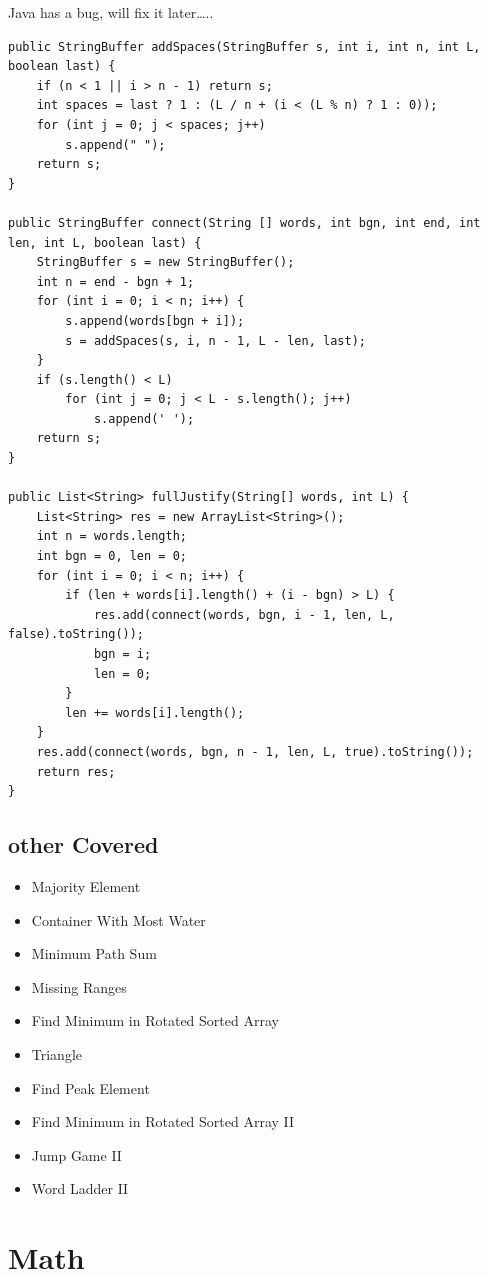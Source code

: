 \documentclass[12pt]{book}
\begin{document}
Java has a bug, will fix it later\ldots{}..

\lstset{language=java,label= ,caption= ,numbers=none}
\begin{lstlisting}
public StringBuffer addSpaces(StringBuffer s, int i, int n, int L, boolean last) {
    if (n < 1 || i > n - 1) return s;
    int spaces = last ? 1 : (L / n + (i < (L % n) ? 1 : 0));
    for (int j = 0; j < spaces; j++)
        s.append(" ");
    return s;
}

public StringBuffer connect(String [] words, int bgn, int end, int len, int L, boolean last) {
    StringBuffer s = new StringBuffer();
    int n = end - bgn + 1;
    for (int i = 0; i < n; i++) {
        s.append(words[bgn + i]);
        s = addSpaces(s, i, n - 1, L - len, last);
    }
    if (s.length() < L)
        for (int j = 0; j < L - s.length(); j++) 
            s.append(' ');
    return s;
}

public List<String> fullJustify(String[] words, int L) {
    List<String> res = new ArrayList<String>();
    int n = words.length;
    int bgn = 0, len = 0;
    for (int i = 0; i < n; i++) {
        if (len + words[i].length() + (i - bgn) > L) {
            res.add(connect(words, bgn, i - 1, len, L, false).toString());
            bgn = i;
            len = 0;
        }
        len += words[i].length();
    }
    res.add(connect(words, bgn, n - 1, len, L, true).toString());
    return res;
}
\end{lstlisting}

\section{other Covered}
\label{sec-20-2}
\begin{itemize}
\item Majority Element
\item Container With Most Water
\item Minimum Path Sum
\item Missing Ranges
\item Find Minimum in Rotated Sorted Array
\item Triangle
\item Find Peak Element
\item Find Minimum in Rotated Sorted Array II
\item Jump Game II
\item Word Ladder II
\end{itemize}

\chapter{Math}
\label{sec-21}
\end{document}
